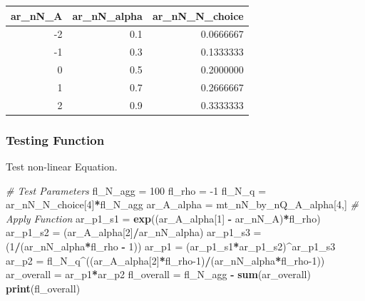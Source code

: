 \documentclass[
]{book}
\newenvironment{Shaded}{\begin{snugshade}}{\end{snugshade}}
\newcommand{\CommentTok}[1]{\textcolor[rgb]{0.56,0.35,0.01}{\textit{#1}}}
\newcommand{\DecValTok}[1]{\textcolor[rgb]{0.00,0.00,0.81}{#1}}
\newcommand{\KeywordTok}[1]{\textcolor[rgb]{0.13,0.29,0.53}{\textbf{#1}}}
\newcommand{\NormalTok}[1]{#1}
\newcommand{\OperatorTok}[1]{\textcolor[rgb]{0.81,0.36,0.00}{\textbf{#1}}}
\newcommand{\StringTok}[1]{\textcolor[rgb]{0.31,0.60,0.02}{#1}}
\begin{document}
\begin{table}[!h]
\centering
\begin{tabular}{r|r|r}
\hline
ar\_nN\_A & ar\_nN\_alpha & ar\_nN\_N\_choice\\
\hline
\rowcolor{gray!6}  -2 & 0.1 & 0.0666667\\
\hline
-1 & 0.3 & 0.1333333\\
\hline
\rowcolor{gray!6}  0 & 0.5 & 0.2000000\\
\hline
1 & 0.7 & 0.2666667\\
\hline
\rowcolor{gray!6}  2 & 0.9 & 0.3333333\\
\hline
\end{tabular}
\end{table}

\hypertarget{testing-function}{%
\subsubsection{Testing Function}\label{testing-function}}

Test non-linear Equation.

\begin{Shaded}
\begin{Highlighting}[]
\CommentTok{\# Test Parameters}
\NormalTok{fl\_N\_agg =}\StringTok{ }\DecValTok{100}
\NormalTok{fl\_rho =}\StringTok{ }\DecValTok{{-}1}
\NormalTok{fl\_N\_q =}\StringTok{ }\NormalTok{ar\_nN\_N\_choice[}\DecValTok{4}\NormalTok{]}\OperatorTok{*}\NormalTok{fl\_N\_agg}
\NormalTok{ar\_A\_alpha =}\StringTok{ }\NormalTok{mt\_nN\_by\_nQ\_A\_alpha[}\DecValTok{4}\NormalTok{,]}
\CommentTok{\# Apply Function}
\NormalTok{ar\_p1\_s1 =}\StringTok{ }\KeywordTok{exp}\NormalTok{((ar\_A\_alpha[}\DecValTok{1}\NormalTok{] }\OperatorTok{{-}}\StringTok{ }\NormalTok{ar\_nN\_A)}\OperatorTok{*}\NormalTok{fl\_rho)}
\NormalTok{ar\_p1\_s2 =}\StringTok{ }\NormalTok{(ar\_A\_alpha[}\DecValTok{2}\NormalTok{]}\OperatorTok{/}\NormalTok{ar\_nN\_alpha)}
\NormalTok{ar\_p1\_s3 =}\StringTok{ }\NormalTok{(}\DecValTok{1}\OperatorTok{/}\NormalTok{(ar\_nN\_alpha}\OperatorTok{*}\NormalTok{fl\_rho }\OperatorTok{{-}}\StringTok{ }\DecValTok{1}\NormalTok{))}
\NormalTok{ar\_p1 =}\StringTok{ }\NormalTok{(ar\_p1\_s1}\OperatorTok{*}\NormalTok{ar\_p1\_s2)}\OperatorTok{\^{}}\NormalTok{ar\_p1\_s3}
\NormalTok{ar\_p2 =}\StringTok{ }\NormalTok{fl\_N\_q}\OperatorTok{\^{}}\NormalTok{((ar\_A\_alpha[}\DecValTok{2}\NormalTok{]}\OperatorTok{*}\NormalTok{fl\_rho}\DecValTok{{-}1}\NormalTok{)}\OperatorTok{/}\NormalTok{(ar\_nN\_alpha}\OperatorTok{*}\NormalTok{fl\_rho}\DecValTok{{-}1}\NormalTok{))}
\NormalTok{ar\_overall =}\StringTok{ }\NormalTok{ar\_p1}\OperatorTok{*}\NormalTok{ar\_p2}
\NormalTok{fl\_overall =}\StringTok{ }\NormalTok{fl\_N\_agg }\OperatorTok{{-}}\StringTok{ }\KeywordTok{sum}\NormalTok{(ar\_overall)}
\KeywordTok{print}\NormalTok{(fl\_overall)}
\end{Highlighting}
\end{Shaded}
\end{document}
